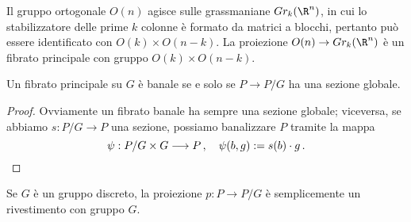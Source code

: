\begin{ex}
	Il gruppo ortogonale $O(n)$ agisce sulle grassmaniane $Gr_{k}(\R^{n})$,
	in cui lo stabilizzatore delle prime $k$ colonne è formato da matrici a blocchi,
	pertanto può essere identificato con $O(k) \times O(n-k)$.
	La proiezione $O(n) \to Gr_{k}(\R^{n})$ è un fibrato principale con gruppo
	$O(k) \times O(n-k)$.
\end{ex}

%		
%		


\begin{prop}
	Un fibrato principale su $G$ è banale se e solo se $P \to P/G$ ha una sezione globale.
	\begin{proof}
		Ovviamente un fibrato banale ha sempre una sezione globale; viceversa,
		se abbiamo $s:P/G \to P$ una sezione, possiamo banalizzare $P$ tramite la mappa
		\begin{equation*}
			\psi : P/G \times G \longrightarrow P\,,
			\quad \psi(b,g) := s(b) \cdot g\,. \qedhere
		\end{equation*}
	\end{proof}
\end{prop}

\begin{ex}
	Se $G$ è un gruppo discreto, la proiezione $p : P \to P/G$ 
	è semplicemente un rivestimento con gruppo $G$. 
\end{ex}

